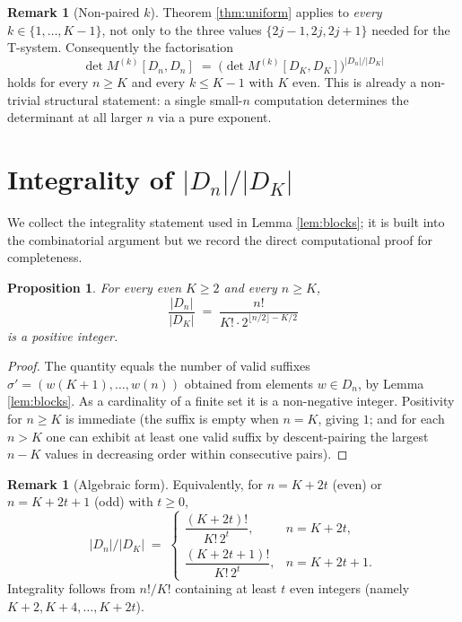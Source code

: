 \documentclass[11pt]{article}
\newtheorem{proposition}[theorem]{Proposition}
\theoremstyle{definition}
\newtheorem{remark}[theorem]{Remark}
\begin{document}
\begin{remark}[Non-paired $k$]
Theorem \ref{thm:uniform} applies to \emph{every} $k \in \{1, \ldots, K-1\}$, not only to the three values $\{2j-1, 2j, 2j+1\}$ needed for the T-system.  Consequently the factorisation
\[
\det M^{(k)}[D_n, D_n] \;=\; \bigl(\det M^{(k)}[D_K, D_K]\bigr)^{|D_n|/|D_K|}
\]
holds for every $n \geq K$ and every $k \leq K-1$ with $K$ even.  This is already a non-trivial structural statement: a single small-$n$ computation determines the determinant at all larger $n$ via a pure exponent.
\end{remark}

\section{Integrality of $|D_n|/|D_K|$}

We collect the integrality statement used in Lemma \ref{lem:blocks}; it is built into the combinatorial argument but we record the direct computational proof for completeness.

\begin{proposition}\label{prop:integrality}
For every even $K \geq 2$ and every $n \geq K$,
\[
\frac{|D_n|}{|D_K|} \;=\; \frac{n!}{K! \cdot 2^{\lfloor n/2\rfloor - K/2}}
\]
is a positive integer.
\end{proposition}

\begin{proof}
The quantity equals the number of valid suffixes $\sigma' = (w(K+1),\ldots,w(n))$ obtained from elements $w \in D_n$, by Lemma \ref{lem:blocks}.  As a cardinality of a finite set it is a non-negative integer.  Positivity for $n \geq K$ is immediate (the suffix is empty when $n = K$, giving $1$; and for each $n > K$ one can exhibit at least one valid suffix by descent-pairing the largest $n - K$ values in decreasing order within consecutive pairs).
\end{proof}

\begin{remark}[Algebraic form]
Equivalently, for $n = K + 2t$ (even) or $n = K + 2t + 1$ (odd) with $t \geq 0$,
\[
|D_n|/|D_K| \;=\;
\begin{cases}
\dfrac{(K+2t)!}{K!\,2^t}, & n = K+2t, \\[4pt]
\dfrac{(K+2t+1)!}{K!\,2^t}, & n = K+2t+1.
\end{cases}
\]
Integrality follows from $n!/K!$ containing at least $t$ even integers (namely $K+2, K+4, \ldots, K+2t$).
\end{remark}
\end{document}

